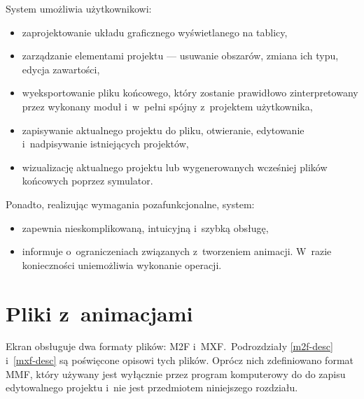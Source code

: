 System umożliwia użytkownikowi:
\begin{itemize}
	\item zaprojektowanie układu graficznego wyświetlanego na tablicy,
	\item zarządzanie elementami projektu --- usuwanie obszarów, zmiana ich typu, edycja zawartości,
	\item wyeksportowanie pliku końcowego, który zostanie prawidłowo zinterpretowany przez wykonany moduł i~w~pełni spójny z~projektem użytkownika,
	\item zapisywanie aktualnego projektu do pliku, otwieranie, edytowanie i~nadpisywanie istniejących projektów,
	\item wizualizację aktualnego projektu lub wygenerowanych wcześniej plików końcowych poprzez symulator.
\end{itemize}

Ponadto, realizując wymagania pozafunkcjonalne, system:
\begin{itemize}
	\item zapewnia nieskomplikowaną, intuicyjną i~szybką obsługę,
	\item informuje o~ograniczeniach związanych z~tworzeniem animacji. W~razie konieczności uniemożliwia wykonanie operacji.
\end{itemize}

\section{Pliki z~animacjami}
Ekran obsługuje dwa formaty plików: M2F i~MXF.~Podrozdziały \ref{m2f-desc} i~\ref{mxf-desc} są poświęcone opisowi tych plików. Oprócz nich zdefiniowano format MMF, który używany jest wyłącznie przez program komputerowy do do zapisu edytowalnego projektu i~nie jest przedmiotem niniejszego rozdziału.

